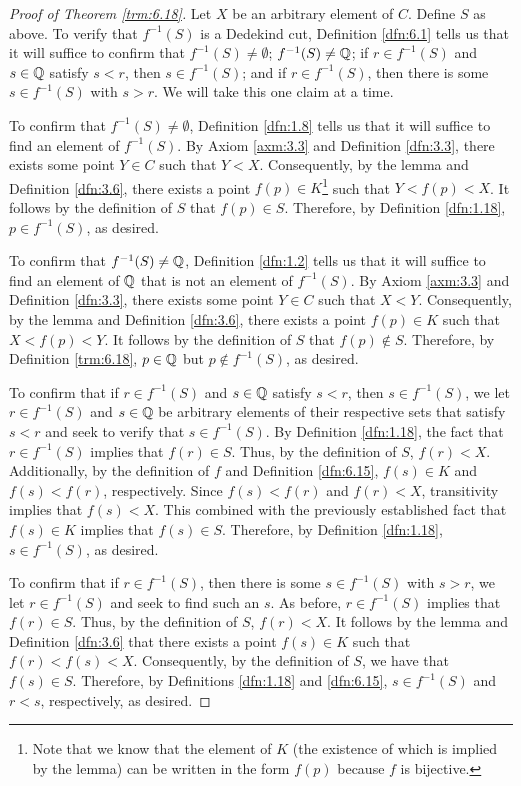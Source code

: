 \documentclass[../main.tex]{subfiles}
\begin{document}
\begin{theorem}
\begin{proof}[Proof of Theorem \ref{trm:6.18}]
        Let $X$ be an arbitrary element of $C$. Define $S$ as above. To verify that $f^{-1}(S)$ is a Dedekind cut, Definition \ref{dfn:6.1} tells us that it will suffice to confirm that $f^{-1}(S)\neq\emptyset$; $f^{-1}(S)\neq\mathbb{Q}$; if $r\in f^{-1}(S)$ and $s\in\mathbb{Q}$ satisfy $s<r$, then $s\in f^{-1}(S)$; and if $r\in f^{-1}(S)$, then there is some $s\in f^{-1}(S)$ with $s>r$. We will take this one claim at a time.\par
        To confirm that $f^{-1}(S)\neq\emptyset$, Definition \ref{dfn:1.8} tells us that it will suffice to find an element of $f^{-1}(S)$. By Axiom \ref{axm:3.3} and Definition \ref{dfn:3.3}, there exists some point $Y\in C$ such that $Y<X$. Consequently, by the lemma and Definition \ref{dfn:3.6}, there exists a point $f(p)\in K$\footnote{Note that we know that the element of $K$ (the existence of which is implied by the lemma) can be written in the form $f(p)$ because $f$ is bijective.} such that $Y<f(p)<X$. It follows by the definition of $S$ that $f(p)\in S$. Therefore, by Definition \ref{dfn:1.18}, $p\in f^{-1}(S)$, as desired.\par
        To confirm that $f^{-1}(S)\neq\mathbb{Q}$, Definition \ref{dfn:1.2} tells us that it will suffice to find an element of $\mathbb{Q}$ that is not an element of $f^{-1}(S)$. By Axiom \ref{axm:3.3} and Definition \ref{dfn:3.3}, there exists some point $Y\in C$ such that $X<Y$. Consequently, by the lemma and Definition \ref{dfn:3.6}, there exists a point $f(p)\in K$ such that $X<f(p)<Y$. It follows by the definition of $S$ that $f(p)\notin S$. Therefore, by Definition \ref{trm:6.18}, $p\in\mathbb{Q}$ but $p\notin f^{-1}(S)$, as desired.\par
        To confirm that if $r\in f^{-1}(S)$ and $s\in\mathbb{Q}$ satisfy $s<r$, then $s\in f^{-1}(S)$, we let $r\in f^{-1}(S)$ and $s\in\mathbb{Q}$ be arbitrary elements of their respective sets that satisfy $s<r$ and seek to verify that $s\in f^{-1}(S)$. By Definition \ref{dfn:1.18}, the fact that $r\in f^{-1}(S)$ implies that $f(r)\in S$. Thus, by the definition of $S$, $f(r)<X$. Additionally, by the definition of $f$ and Definition \ref{dfn:6.15}, $f(s)\in K$ and $f(s)<f(r)$, respectively. Since $f(s)<f(r)$ and $f(r)<X$, transitivity implies that $f(s)<X$. This combined with the previously established fact that $f(s)\in K$ implies that $f(s)\in S$. Therefore, by Definition \ref{dfn:1.18}, $s\in f^{-1}(S)$, as desired.\par
        To confirm that if $r\in f^{-1}(S)$, then there is some $s\in f^{-1}(S)$ with $s>r$, we let $r\in f^{-1}(S)$ and seek to find such an $s$. As before, $r\in f^{-1}(S)$ implies that $f(r)\in S$. Thus, by the definition of $S$, $f(r)<X$. It follows by the lemma and Definition \ref{dfn:3.6} that there exists a point $f(s)\in K$ such that $f(r)<f(s)<X$. Consequently, by the definition of $S$, we have that $f(s)\in S$. Therefore, by Definitions \ref{dfn:1.18} and \ref{dfn:6.15}, $s\in f^{-1}(S)$ and $r<s$, respectively, as desired.\par\smallskip

\end{proof}
\end{theorem}
\end{document}
